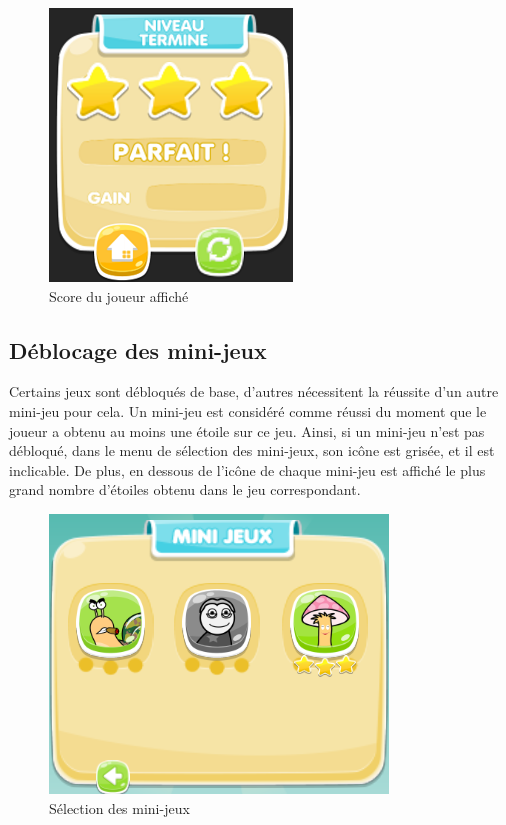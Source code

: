 \begin{figure}[H]\centering
  \includegraphics[scale=.9]{./img/MenuMort.png}
  \caption{Score du joueur affiché}
\end{figure}

\subsection{Déblocage des mini-jeux}

Certains jeux sont débloqués de base, d'autres nécessitent la réussite d'un autre mini-jeu pour cela. Un mini-jeu est considéré comme réussi du moment que le joueur a obtenu au moins une étoile sur ce jeu. Ainsi, si un mini-jeu n'est pas débloqué, dans le menu de sélection des mini-jeux, son icône est grisée, et il est inclicable. De plus, en dessous de l'icône de chaque mini-jeu est affiché le plus grand nombre d'étoiles obtenu dans le jeu correspondant.

\begin{figure}[H]\centering
  \includegraphics[scale=.9]{./img/SelectionMiniJeu.png}
  \caption{Sélection des mini-jeux}
  \label{SelectionMiniJeu}
\end{figure}

